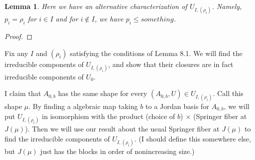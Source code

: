\documentclass[12pt,psamsfonts]{article}
\newtheorem{lemma}[theorem]{Lemma}
\begin{document}
\begin{lemma}
    Here we have an alternative characterization of \(U_{I, (\rho_i)}\).
    Namely, \(p_i = \rho_i\) for \(i \in I\) and for \(i \notin I\), we have \(p_i \leq something\).
\end{lemma}
\begin{proof}
    
\end{proof}
Fix any \(I\) and \((\rho_i)\) satisfying the conditions of Lemma 8.1.
We will find the irreducible components of \(U_{I, (\rho_i)}\), and show that their closures are in fact irreducible components of \(U_0\).
\par I claim that \(A_{0,b}\) has the same shape for every \((A_{0, b}, U) \in U_{I, (\rho_i)}\).
Call this shape \(\mu\).
By finding a algebraic map taking \(b\) to a Jordan basis for \(A_{0,b}\), we will put \(U_{I, (\rho_i)}\) in isomorphism with the product (choice of \(b\)) \(\times\) (Springer fiber at \(J(\mu)\)).
Then we will use our result about the usual Springer fiber at \(J(\mu)\) to find the irreducible components of \(U_{I, (\rho_i)}\).
(I should define this somewhere else, but \(J(\mu)\) just has the blocks in order of nonincreasing size.)
\end{document}
